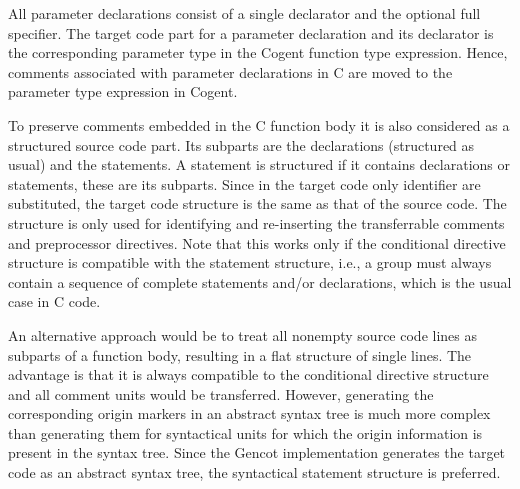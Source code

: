 All parameter declarations consist of a single declarator and the optional full specifier. The target code part for
a parameter declaration and its declarator is the corresponding parameter type in the Cogent function type expression.
Hence, comments associated with parameter declarations in C are moved to the parameter type expression in Cogent.

To preserve comments embedded in the C function body it is also considered as a structured source code part. Its 
subparts are the declarations (structured as usual) and the statements. A statement is structured if it contains declarations
or statements, these are its subparts. Since in the target code only identifier are substituted, the target code
structure is the same as that of the source code. The structure is only used for identifying and re-inserting
the transferrable comments and preprocessor directives. Note that this works only if the conditional directive 
structure is compatible with the statement structure, i.e., a group must always contain a sequence of complete
statements and/or declarations, which is the usual case in C code.

An alternative approach would be to treat all nonempty source code lines as subparts of a function body, resulting
in a flat structure of single lines. The advantage is that it is always compatible to the conditional directive structure and
all comment units would be transferred. However, generating the corresponding origin markers in an abstract syntax
tree is much more complex than generating them for syntactical units for which the origin information is present
in the syntax tree. Since the Gencot implementation generates the
target code as an abstract syntax tree, the syntactical statement structure is preferred. 

 
